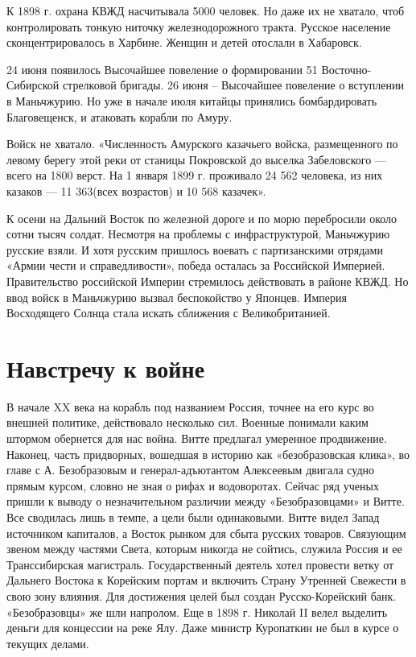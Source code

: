 К 1898 г. охрана КВЖД насчитывала 5000 человек. Но даже их не хватало, чтоб контролировать тонкую ниточку железнодорожного тракта. Русское население сконцентрировалось в Харбине. Женщин и детей отослали в Хабаровск.

24 июня появилось Высочайшее повеление о формировании 51 Восточно-Сибирской стрелковой бригады. 26 июня – Высочайшее повеление о вступлении в Маньчжурию. Но уже в начале июля китайцы принялись бомбардировать Благовещенск, и атаковать корабли по Амуру.

Войск не хватало. «Численность Амурского казачьего войска, размещенного по левому берегу этой реки от станицы Покровской до выселка Забеловского — всего на 1800 верст. На 1 января 1899 г. проживало 24 562 человека, из них казаков — 11 363(всех возрастов) и 10 568 казачек».

К осени на Дальний Восток по железной дороге и по морю перебросили около сотни тысяч солдат. Несмотря на проблемы с инфраструктурой, Маньчжурию русские взяли. И хотя русским пришлось воевать с партизанскими отрядами «Армии чести и справедливости», победа осталась за Российской Империей.
Правительство российской Империи стремилось действовать в районе КВЖД. Но ввод войск в Маньчжурию вызвал беспокойство у Японцев. Империя Восходящего Солнца стала искать сближения с Великобританией.


\section{Навстречу к войне
}

В начале XX века на корабль под названием Россия, точнее на его курс во внешней политике, действовало несколько сил. Военные понимали каким штормом обернется для нас война. Витте предлагал умеренное продвижение. Наконец, часть придворных, вошедшая в историю как «безобразовская клика», во главе с А. Безобразовым и генерал-адъютантом Алексеевым двигала судно прямым курсом, словно не зная о рифах и водоворотах.
Сейчас ряд ученых пришли к выводу о незначительном различии между «Безобразовцами» и Витте. Все сводилась лишь в темпе, а цели были одинаковыми.
Витте видел Запад источником капиталов, а Восток рынком для сбыта русских товаров. Связующим звеном между частями Света, которым никогда не сойтись, служила Россия и ее Транссибирская магистраль. Государственный деятель хотел провести ветку от Дальнего Востока к Корейским портам и включить Страну Утренней Свежести в свою зону влияния. Для достижения целей был создан Русско-Корейский банк.
«Безобразовцы» же шли напролом. Еще в 1898 г. Николай II велел выделить деньги для концессии на реке Ялу. Даже министр Куропаткин не был в курсе о текущих делами.

